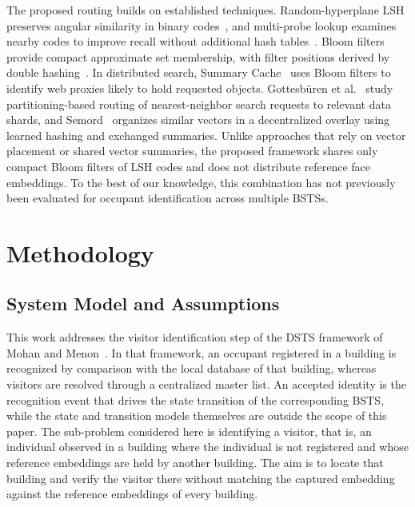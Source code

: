 \documentclass[pdflatex,sn-mathphys-num]{sn-jnl}%
\theoremstyle{thmstyleone}%
\theoremstyle{thmstyletwo}%
\theoremstyle{thmstylethree}%
\begin{document}
The proposed routing builds on established techniques. Random-hyperplane LSH preserves angular similarity in binary codes~\cite{charikar2002}, and multi-probe lookup examines nearby codes to improve recall without additional hash tables~\cite{lv2007}. Bloom filters~\cite{bloom1970} provide compact approximate set membership, with filter positions derived by double hashing~\cite{kirsch2006}. In distributed search, Summary Cache~\cite{fan2000} uses Bloom filters to identify web proxies likely to hold requested objects. Gottesb{\"u}ren et al.~\cite{gottesbueren2024} study partitioning-based routing of nearest-neighbor search requests to relevant data shards, and Semord~\cite{wang2026semord} organizes similar vectors in a decentralized overlay using learned hashing and exchanged summaries. Unlike approaches that rely on vector placement or shared vector summaries, the proposed framework shares only compact Bloom filters of LSH codes and does not distribute reference face embeddings. To the best of our knowledge, this combination has not previously been evaluated for occupant identification across multiple BSTSs.


\section{Methodology}
\label{sec:methodology}

\subsection{System Model and Assumptions}
\label{subsec:system_model}

This work addresses the visitor identification step of the DSTS framework of Mohan and Menon~\cite{mohan2020}. In that framework, an occupant registered in a building is recognized by comparison with the local database of that building, whereas visitors are resolved through a centralized master list. An accepted identity is the recognition event that drives the state transition of the corresponding BSTS, while the state and transition models themselves are outside the scope of this paper. The sub-problem considered here is identifying a visitor, that is, an individual observed in a building where the individual is not registered and whose reference embeddings are held by another building. The aim is to locate that building and verify the visitor there without matching the captured embedding against the reference embeddings of every building.
\end{document}
